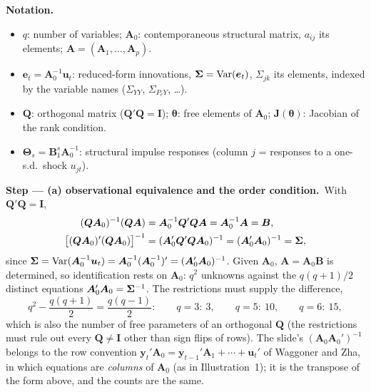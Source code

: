 \documentclass[11pt,a4paper]{article}
\newenvironment{notacao}{\par\smallskip\noindent\textbf{Notation.}\begin{itemize}[leftmargin=1.4em,topsep=1pt,itemsep=0pt]\small}{\end{itemize}}
\newcommand{\passo}[2]{\par\smallskip\noindent\textbf{Step --- #1.}~#2}
\begin{document}
\begin{sol}
\begin{notacao}
\item $q$: number of variables; $\bm A_0$: contemporaneous structural matrix, $a_{ij}$ its elements; $\bm A=(\bm A_1,\dots,\bm A_p)$.
\item $\bm e_t=\bm A_0^{-1}\bm u_t$: reduced-form innovations, $\bm{\Sigma}=\mathrm{Var}(\bm e_t)$, $\Sigma_{jk}$ its elements, indexed by
the variable names ($\Sigma_{Y\!Y}$, $\Sigma_{P_cY}$, \dots).
\item $\bm Q$: orthogonal matrix ($\bm Q'\bm Q=\bm I$); $\bm\theta$: free elements of $\bm A_0$; $\bm J(\bm\theta)$: Jacobian of the rank condition.
\item $\bm\Theta_s=\bm B_1^s\bm A_0^{-1}$: structural impulse responses (column $j$ = responses to a one-s.d.\ shock $u_{jt}$).
\end{notacao}

\passo{(a) observational equivalence and the order condition}{With $\bm Q'\bm Q=\bm I$,
\begin{align}
(\bm Q\bm A_0)^{-1}(\bm Q\bm A)&=\bm A_0^{-1}\bm Q'\bm Q\bm A=\bm A_0^{-1}\bm A=\bm B,\nonumber\\
\big[(\bm Q\bm A_0)'(\bm Q\bm A_0)\big]^{-1}&=(\bm A_0'\bm Q'\bm Q\bm A_0)^{-1}=(\bm A_0'\bm A_0)^{-1}=\bm{\Sigma},\label{eq:q17eq}
\end{align}
since $\bm{\Sigma}=\mathrm{Var}(\bm A_0^{-1}\bm u_t)=\bm A_0^{-1}(\bm A_0^{-1})'=(\bm A_0'\bm A_0)^{-1}$. Given $\bm A_0$, $\bm A=\bm A_0\bm B$ is
determined, so identification rests on $\bm A_0$: $q^2$ unknowns against the $q(q+1)/2$ distinct equations
$\bm A_0'\bm A_0=\bm{\Sigma}^{-1}$. The restrictions must supply the difference,
\begin{equation}
q^2-\frac{q(q+1)}2=\frac{q(q-1)}2:\qquad q=3:\ 3,\qquad q=5:\ 10,\qquad q=6:\ 15,\label{eq:q17order}
\end{equation}
which is also the number of free parameters of an orthogonal $\bm Q$ (the restrictions must rule out every $\bm Q\neq\bm I$
other than sign flips of rows). The slide's $(\bm A_0\bm A_0')^{-1}$ belongs to the row convention
$\bm y_t'\bm A_0=\bm y_{t-1}'\bm A_1+\cdots+\bm u_t'$ of Waggoner and Zha, in which equations are \emph{columns} of $\bm A_0$
(as in Illustration~1); it is the transpose of the form above, and the counts are the same.}


\end{sol}
\end{document}
